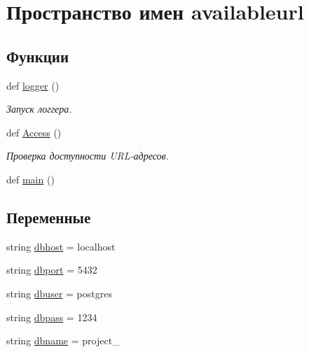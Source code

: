 \hypertarget{namespaceavailableurl}{}\section{Пространство имен availableurl}
\label{namespaceavailableurl}
\subsection*{Функции}
\begin{DoxyCompactItemize}
\item 
def \hyperlink{namespaceavailableurl_a25d6c72ce2cd54a5490720f1319c68dc}{logger} ()
\begin{DoxyCompactList}\small\item\em Запуск логгера. \end{DoxyCompactList}\item 
def \hyperlink{namespaceavailableurl_aff3d4545f3483782a407aab7859602f4}{Access} ()
\begin{DoxyCompactList}\small\item\em Проверка доступности U\+R\+L-\/адресов. \end{DoxyCompactList}\item 
def \hyperlink{namespaceavailableurl_a9bdd46562a5ef06276fceee5109958e7}{main} ()
\end{DoxyCompactItemize}
\subsection*{Переменные}
\begin{DoxyCompactItemize}
\item 
string \hyperlink{namespaceavailableurl_a37fb41a94b1d571e29110ace71a6779b}{dbhost} = \textquotesingle{}localhost\textquotesingle{}
\item 
string \hyperlink{namespaceavailableurl_a390f7a9e2e87f1ef981f38c17606925a}{dbport} = \textquotesingle{}5432\textquotesingle{}
\item 
string \hyperlink{namespaceavailableurl_a7aad22fecf6c516bded3d3c0a571bd40}{dbuser} = \textquotesingle{}postgres\textquotesingle{}
\item 
string \hyperlink{namespaceavailableurl_a213229dedd788b05a4d417a6e54d5662}{dbpass} = \textquotesingle{}1234\textquotesingle{}
\item 
string \hyperlink{namespaceavailableurl_ac13da61208e787ad038413b3779bf437}{dbname} = \textquotesingle{}project\+\_\textquotesingle{}
\end{DoxyCompactItemize}


